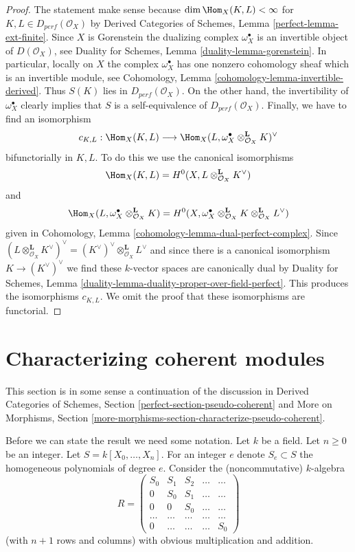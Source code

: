 \begin{proof}
The statement make sense because $\dim \Hom_X(K, L) < \infty$
for $K, L \in D_{perf}(\mathcal{O}_X)$ by
Derived Categories of Schemes, Lemma \ref{perfect-lemma-ext-finite}.
Since $X$ is Gorenstein the dualizing complex $\omega_X^\bullet$
is an invertible object of $D(\mathcal{O}_X)$, see
Duality for Schemes, Lemma \ref{duality-lemma-gorenstein}.
In particular, locally on $X$ the complex $\omega_X^\bullet$
has one nonzero cohomology sheaf which is an invertible module, see
Cohomology, Lemma \ref{cohomology-lemma-invertible-derived}.
Thus $S(K)$ lies in $D_{perf}(\mathcal{O}_X)$.
On the other hand, the invertibility of $\omega_X^\bullet$
clearly implies that $S$ is a self-equivalence of $D_{perf}(\mathcal{O}_X)$.
Finally, we have to find an isomorphism
$$
c_{K, L} : \Hom_X(K, L) \longrightarrow
\Hom_X(L, \omega_X^\bullet \otimes_{\mathcal{O}_X}^\mathbf{L} K)^\vee
$$
bifunctorially in $K, L$. To do this we use the canonical isomorphisms
$$
\Hom_X(K, L) = H^0(X, L \otimes_{\mathcal{O}_X}^\mathbf{L} K^\vee)
$$
and
$$
\Hom_X(L, \omega_X^\bullet \otimes_{\mathcal{O}_X}^\mathbf{L} K) =
H^0(X,
\omega_X^\bullet \otimes_{\mathcal{O}_X}^\mathbf{L} K
\otimes_{\mathcal{O}_X}^\mathbf{L} L^\vee)
$$
given in Cohomology, Lemma \ref{cohomology-lemma-dual-perfect-complex}.
Since $(L \otimes_{\mathcal{O}_X}^\mathbf{L} K^\vee)^\vee =
(K^\vee)^\vee \otimes_{\mathcal{O}_X}^\mathbf{L} L^\vee$
and since there is a canonical isomorphism $K \to (K^\vee)^\vee$
we find these $k$-vector spaces are canonically dual by
Duality for Schemes, Lemma
\ref{duality-lemma-duality-proper-over-field-perfect}.
This produces the isomorphisms $c_{K, L}$.
We omit the proof that these isomorphisms are functorial.
\end{proof}

\section{Characterizing coherent modules}
\label{equiv-section-coherent}
This section is in some sense a continuation of the discussion
in Derived Categories of Schemes, Section \ref{perfect-section-pseudo-coherent}
and More on Morphisms, Section
\ref{more-morphisms-section-characterize-pseudo-coherent}.

\medskip\noindent
Before we can state the result we need some notation.
Let $k$ be a field. Let $n \geq 0$ be an integer.
Let $S = k[X_0, \ldots, X_n]$. For an integer $e$ denote
$S_e \subset S$ the homogeneous polynomials of degree $e$.
Consider the (noncommutative) $k$-algebra
$$
R =
\left(
\begin{matrix}
S_0 & S_1 & S_2 & \ldots & \ldots \\
0 & S_0 & S_1 & \ldots & \ldots\\
0 & 0 & S_0 & \ldots & \ldots \\
\ldots & \ldots & \ldots & \ldots & \ldots \\
0 & \ldots & \ldots & \ldots & S_0
\end{matrix}
\right)
$$
(with $n + 1$ rows and columns) with obvious multiplication and addition.

